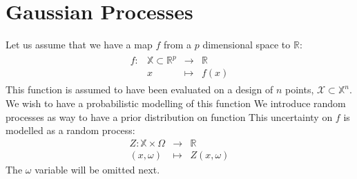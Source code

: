 \documentclass[../../Main_ManuscritThese.tex]{subfiles}
\begin{document}
\label{chap:adaptative_design_gp}
\minitoc
\newpage
\subfileLocal{\pagestyle{contentStyle}}



\section{Gaussian Processes}
\label{sec:GP}

Let us assume that we have a map $f$ from a $p$ dimensional space to $\mathbb{R}$:
\begin{align}
  \begin{array}{rrcl}
    f: & \mathbb{X} \subset \mathbb{R}^p& \longrightarrow & \mathbb{R} \\
       & x & \longmapsto & f(x)
  \end{array}
\end{align}
This function is assumed to have been evaluated on a design of $n$ points, $\mathcal{X} \subset \mathbb{X}^n$. 
We wish to have a probabilistic modelling of this function
We introduce random processes as way to have a prior distribution on function
This uncertainty on $f$ is modelled as a random process:
\begin{equation}
  \begin{array}{rcl}
    Z: \mathbb{X} \times \Omega& \longrightarrow & \mathbb{R} \\
    (x,\omega) & \longmapsto & Z(x,\omega)
  \end{array}
\end{equation}
The $\omega$ variable will be omitted next.
\end{document}
